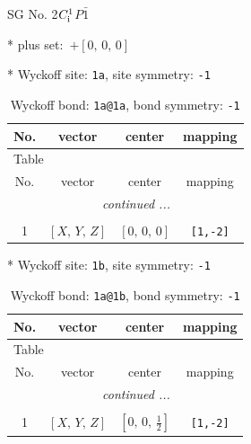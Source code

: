 \documentclass[fleqn,8pt]{jsarticle}
\begin{document}
\setcounter{MaxMatrixCols}{32}

\renewcommand{\tablename}{Table~}
\renewcommand{\figurename}{Figure~}
\begin{center}
\LARGE
SG No. 2\quad$C_{\rm i}^{1}$\quad$P\bar{1}$\quad[ triclinic ]
\end{center}

* plus set:\,\,\,$+\left[ 0,\, 0,\, 0 \right]$


* Wyckoff site: {\tt 1a}, site symmetry: {\tt -1}
\renewcommand{\arraystretch}{1.2}
\begin{longtable}{cccc}
\caption{Wyckoff bond: {\tt 1a@1a}, bond symmetry: {\tt -1}}
 \\
 \hline \hline
No. & vector & center & mapping \\ \hline \endfirsthead

\multicolumn{3}{l}{\tablename\ \thetable{}} \\
 \hline \hline
No. & vector & center & mapping \\ \hline \endhead

 \hline \hline
\multicolumn{3}{r}{\footnotesize\it continued ...} \\ \endfoot

 \hline \hline
\multicolumn{3}{r}{} \\ \endlastfoot

1 & $\left[ X,\, Y,\, Z \right]$ & $\left[ 0,\, 0,\, 0 \right]$ & {\tt [1,-2]} \\
\end{longtable}
* Wyckoff site: {\tt 1b}, site symmetry: {\tt -1}
\renewcommand{\arraystretch}{1.2}
\begin{longtable}{cccc}
\caption{Wyckoff bond: {\tt 1a@1b}, bond symmetry: {\tt -1}}
 \\
 \hline \hline
No. & vector & center & mapping \\ \hline \endfirsthead

\multicolumn{3}{l}{\tablename\ \thetable{}} \\
 \hline \hline
No. & vector & center & mapping \\ \hline \endhead

 \hline \hline
\multicolumn{3}{r}{\footnotesize\it continued ...} \\ \endfoot

 \hline \hline
\multicolumn{3}{r}{} \\ \endlastfoot

1 & $\left[ X,\, Y,\, Z \right]$ & $\left[ 0,\, 0,\, \frac{1}{2} \right]$ & {\tt [1,-2]} \\
\end{longtable}
\end{document}

